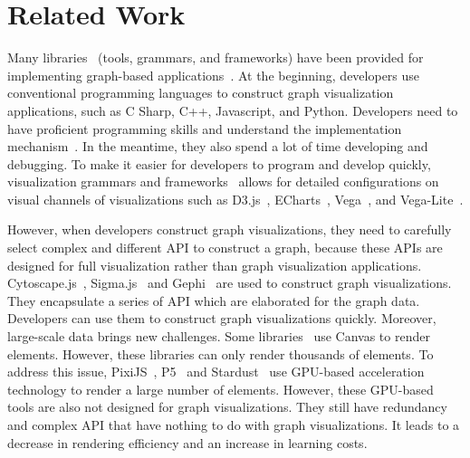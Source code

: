 \section{Related Work}

Many libraries~\cite{DBLP:journals/vi/LiMSSZWZC18,mei2020datav,tableau} (tools, grammars, and frameworks) have been provided for implementing graph-based applications~\cite{wang2018graphprotector,pan2020exemplar}.
At the beginning, developers use conventional programming languages to construct graph visualization applications, such as C Sharp, C++, Javascript, and Python. Developers need to have proficient programming skills and understand the implementation mechanism~\cite{reas2003processing,reas2005processing}.
In the meantime, they also spend a lot of time developing and debugging. To make it easier for developers to program and develop quickly, visualization grammars and frameworks~\cite{lyra,lyra2,heer2010declarative} allows for detailed configurations on visual channels of visualizations such as D3.js~\cite{DBLP:journals/tvcg/BostockOH11}, ECharts~\cite{DBLP:journals/vi/LiMSSZWZC18}, Vega~\cite{DBLP:journals/tvcg/SatyanarayanRHH16}, and Vega-Lite~\cite{DBLP:journals/tvcg/SatyanarayanMWH17}.


However, when developers construct graph visualizations, they need to carefully select complex and different API to construct a graph, because these APIs are designed for full visualization rather than graph visualization applications. Cytoscape.js~\cite{DBLP:journals/bioinformatics/FranzLHDSB16}, Sigma.js~\cite{DBLP:journals/jossw/Coene18} and Gephi~\cite{DBLP:conf/icwsm/BastianHJ09} are used to construct graph visualizations. They encapsulate a series of API which are elaborated for the graph data. Developers can use them to construct graph visualizations quickly.
Moreover, large-scale data brings new challenges.
Some libraries~\cite{heer2005prefuse,wickham2011ggplot2,ren2014ivisdesigner} use Canvas to render elements.
However, these libraries can only render thousands of elements. To address this issue, PixiJS~\cite{graphicslearn}, P5~\cite{DBLP:journals/tvcg/LiM20} and Stardust~\cite{DBLP:journals/cgf/RenLH17} use GPU-based acceleration technology to render a large number of elements.
However, these GPU-based tools are also not designed for graph visualizations.
They still have redundancy and complex API that have nothing to do with graph visualizations. It leads to a decrease in rendering efficiency and an increase in learning costs.

